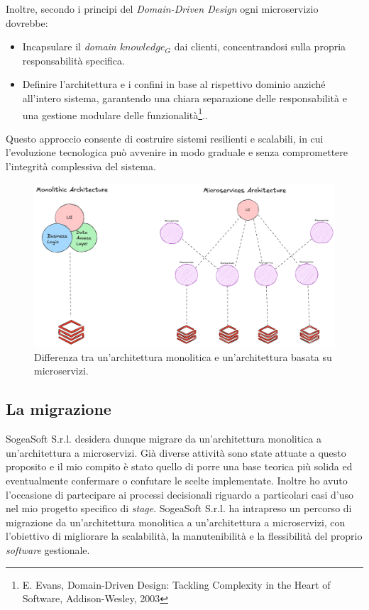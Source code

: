             \vspace{0.2 em}
            \noindent Inoltre, secondo i principi del \textit{Domain-Driven Design} ogni microservizio dovrebbe:  
            \begin{itemize}
                \item Incapsulare il \textit{domain $knowledge_G$} dai clienti, concentrandosi sulla propria responsabilità specifica. 
                \item Definire l’architettura e i confini in base al rispettivo dominio anziché all’intero sistema, garantendo una chiara separazione delle responsabilità e una gestione modulare delle funzionalità\footnote{E. Evans, Domain-Driven Design: Tackling Complexity in the Heart of Software, Addison-Wesley, 2003}..
            \end{itemize}  

            \vspace{0.2 em}
            \noindent Questo approccio consente di costruire sistemi resilienti e scalabili, in cui l'evoluzione tecnologica può avvenire in modo graduale e senza compromettere l'integrità complessiva del sistema.

            \begin{figure}[H]
                \centering
                \includegraphics[width=1.0\linewidth]{BCS-Tessi/images/Monolith-Microservices.png}
                \caption[Differenza tra un sistema monolitico e uno a microservizi]{Differenza tra un'architettura monolitica e un'architettura basata su microservizi.}
                \label{fig:monolith-vs-microservices}
            \end{figure}

        \subsection{La migrazione}
        SogeaSoft S.r.l. desidera dunque migrare da un'architettura monolitica a un'architettura a microservizi. Già diverse attività sono state attuate a questo proposito e il mio compito è stato quello di porre una base teorica più solida ed eventualmente confermare o confutare le scelte implementate. Inoltre ho avuto l'occasione di partecipare ai processi decisionali riguardo a particolari casi d'uso nel mio progetto specifico di \textit{stage}. 
        SogeaSoft S.r.l. ha intrapreso un percorso di migrazione da un'architettura monolitica a un'architettura a microservizi, con l'obiettivo di migliorare la scalabilità, la manutenibilità e la flessibilità del proprio \textit{software} gestionale.  

